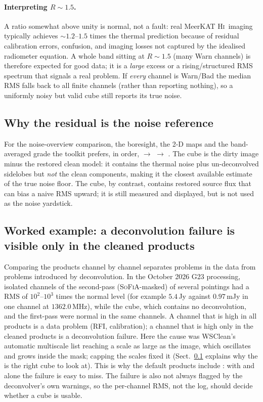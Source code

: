 \documentclass[11pt,a4paper]{article}
\begin{document}
\paragraph{Interpreting $R\sim1.5$.} A ratio somewhat above unity is normal, not
a fault: real MeerKAT \textsc{Hi}\ imaging typically achieves $\sim1.2$--$1.5$
times the thermal prediction because of residual calibration errors, confusion,
and imaging losses not captured by the idealised radiometer equation. A whole
band sitting at $R\sim1.5$ (many \textsf{Warn} channels) is therefore expected
for good data; it is a \emph{large} excess or a rising/structured RMS spectrum
that signals a real problem. If \emph{every} channel is \textsf{Warn}/\textsf{Bad}
the median RMS falls back to all finite channels (rather than reporting nothing),
so a uniformly noisy but valid cube still reports its true noise.

\subsection{Why the residual is the noise reference}\label{sec:noiseref}
For the noise-overview comparison, the boresight, the 2-D maps and the
band-averaged grade the toolkit prefers, in order,  $\to$
 $\to$ .
The  cube is the dirty image minus the restored clean model: it
contains the thermal noise plus un-deconvolved sidelobes but \emph{not} the
clean components, making it the closest available estimate of the true noise
floor. The  cube, by contrast, contains restored source flux that
can bias a naive RMS upward; it is still measured and displayed, but is not used
as the noise yardstick.

\subsection{Worked example: a deconvolution failure is visible only in the cleaned products}
\label{sec:divergence_example}
Comparing the products channel by channel separates problems in the data from problems
introduced by deconvolution. In the October 2026 G23 processing, isolated channels of the
second-pass (\textsc{SoFiA}-masked)  of several pointings had a 
RMS of $10^2$--$10^3$ times the normal level (for example $5.4$\,Jy against $0.97$\,mJy in one
channel at $1362.0$\,MHz), while the  cube, which contains no deconvolution, and
the first-pass  were normal in the same channels. A channel that is high in all
products is a data problem (RFI, calibration); a channel that is high only in the cleaned
products is a deconvolution failure. Here the cause was WSClean's automatic multiscale list
reaching a scale as large as the image, which oscillates and grows inside the mask; capping the
scales fixed it (Sect.~\ref{sec:noiseref} explains why the  is the right cube to
look at). This is why the default products include : with  and
 alone the failure is easy to miss. The failure is also not always flagged by the
deconvolver's own warnings, so the per-channel RMS, not the log, should decide whether a cube
is usable.
\end{document}
